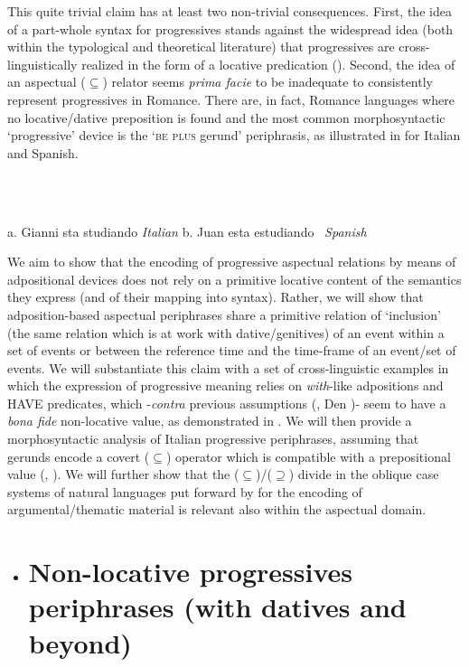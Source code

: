 \documentclass[output=paper,colorlinks,citecolor=brown]{./langscibook}
\begin{document}
This quite trivial claim has at least two non-trivial consequences. First, the idea of a part-whole syntax for progressives stands against the widespread idea (both within the typological and theoretical literature) that progressives are cross-linguistically realized in the form of a locative predication (\citealt{MateuAmadas1999, BybeePerkinsPagliuca1994, DemirdacheUribe-Etxebarria1997}).  Second, the idea of an aspectual (${\subseteq}$) relator seems \textit{prima facie} to be inadequate to consistently represent progressives in Romance. There are, in fact, Romance languages where no locative/dative preposition is found and the most common morphosyntactic ‘progressive’ device is the ‘\textsc{be plus} gerund’ periphrasis, as illustrated in  for Italian and Spanish.

\ea%
    \label{ex:key:9}
    \gll\\
        \\
    \glt
    \z

           a.  Gianni sta studiando         \textit{Italian}      b.   Juan esta estudiando~      \textit{Spanish}

We aim to show that the encoding of progressive aspectual relations by means of adpositional devices does not rely on a primitive locative content of the semantics they express (and of their mapping into syntax). Rather, we will show that adposition-based aspectual periphrases share a primitive relation of ‘inclusion’ (the same relation which is at work with dative/genitives) of an event within a set of events or between the reference time and the time-frame of an event/set of events. We will substantiate this claim with a set of cross-linguistic examples in which the expression of progressive meaning relies on \textit{with}{}-like adpositions and HAVE predicates, which -\textit{contra} previous assumptions (\citealt{Freeze1992}, Den \citealt{Dikken1998})- seem to have a \textit{bona fide} non-locative value, as demonstrated in \citet{Levinson2011}. We will then provide a morphosyntactic analysis of Italian progressive periphrases, assuming that gerunds encode a covert (${\subseteq}$) operator which is compatible with  a prepositional value (\citealt{Gallego2010}, \citealt{Franco2015}). We will further show that the (${\subseteq}$)/(${\supseteq}$) divide in the oblique case systems of natural languages put forward by \citet{FrancoManzini2017b} for the encoding of argumental/thematic material is relevant also within the aspectual domain.

\begin{itemize}
\item \section{Non-locative progressives periphrases (with datives and beyond)}
\end{itemize}
\end{document}
